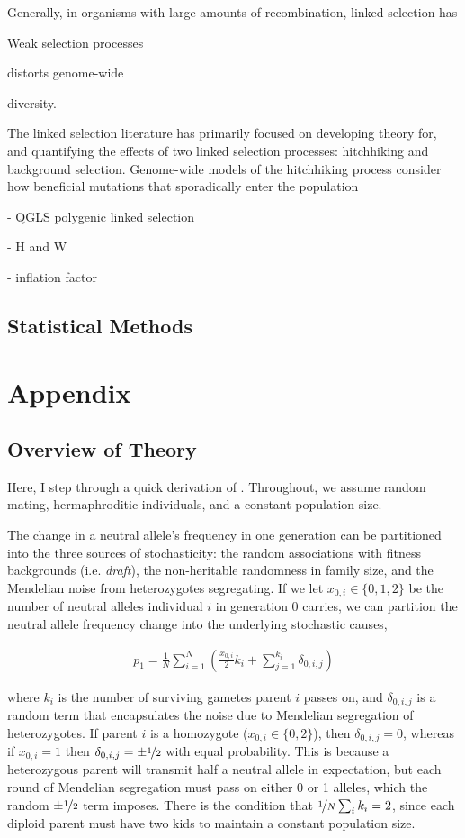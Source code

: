 \documentclass[11pt]{article}
\begin{document}
Generally, in organisms with large amounts of recombination, linked selection
has 


Weak selection processes 

distorts
genome-wide 

diversity.

The linked selection literature has primarily focused on developing theory for,
and quantifying the effects of two linked selection processes: hitchhiking and
background selection. Genome-wide models of the hitchhiking process consider
how beneficial mutations that sporadically enter the population 

- QGLS polygenic linked selection

- H and W

- inflation factor

\subsection*{Statistical Methods}

\section*{Appendix}

\subsection*{Overview of Theory}

Here, I step through a quick derivation of \textcite{Santiago1998-bs}.
Throughout, we assume random mating, hermaphroditic individuals, and a constant
population size. 

The change in a neutral allele's frequency in one generation can be partitioned
into the three sources of stochasticity: the random associations with fitness
backgrounds (i.e. \emph{draft}), the non-heritable randomness in family size,
and the Mendelian noise from heterozygotes segregating. If we let $x_{0,i} \in
\{0, 1, 2\}$ be the number of neutral alleles individual $i$ in generation 0
carries, we can partition the neutral allele frequency change into the
underlying stochastic causes,

\begin{align}
  p_1 = \frac{1}{N} \sum_{i=1}^N \left( \frac{x_{0,i}}{2} k_i + \sum_{j=1}^{k_i} \delta_{0,i,j} \right)
\end{align}

where $k_i$ is the number of surviving gametes parent $i$ passes on, and
$\delta_{0,i,j}$ is a random term that encapsulates the noise due to Mendelian
segregation of heterozygotes. If parent $i$ is a homozygote ($x_{0,i} \in \{0,
2\}$), then $\delta_{0,i,j} = 0$, whereas if $x_{0,i} = 1$ then $\delta_{0,i,j}
= \pm \nicefrac{1}{2}$ with equal probability. This is because a heterozygous
parent will transmit half a neutral allele in expectation, but each round of
Mendelian segregation must pass on either 0 or 1 alleles, which the random $\pm
\nicefrac{1}{2}$ term imposes. There is the condition that $\nicefrac{1}{N}
\sum_i k_i = 2$, since each diploid parent must have two kids to maintain a
constant population size.
\end{document}
